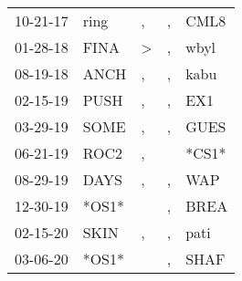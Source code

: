 \begin{supertabular}{lllll}
 10-21-17 &   ring &                , &                , &   CML8 \\
 01-28-18 &   FINA &     \textgreater &                , &   wbyl \\
 08-19-18 &   ANCH &                , &                , &   kabu \\
 02-15-19 &   PUSH &                , &                , &    EX1 \\
 03-29-19 &   SOME &                , &                , &   GUES \\
 06-21-19 &   ROC2 &                , &                  &  *CS1* \\
 08-29-19 &   DAYS &                , &                , &    WAP \\
 12-30-19 &  *OS1* &                  &                , &   BREA \\
 02-15-20 &   SKIN &                , &                , &   pati \\
 03-06-20 &  *OS1* &                  &                , &   SHAF \\
\end{supertabular}
